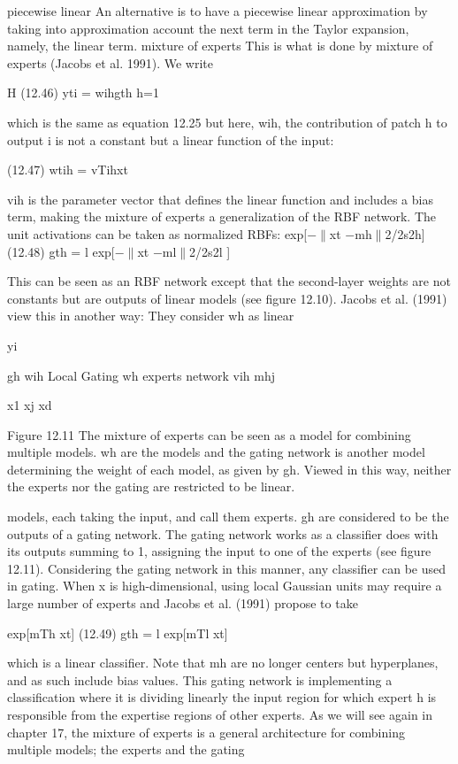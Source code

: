piecewise linear An alternative is to have a piecewise linear approximation by taking into approximation account the next term in the Taylor expansion, namely, the linear term. mixture of experts This is what is done by mixture of experts (Jacobs et al. 1991). We write

H (12.46) yti = wihgth h=1

which is the same as equation 12.25 but here, wih, the contribution of patch h to output i is not a constant but a linear function of the input:

(12.47) wtih = vTihxt

vih is the parameter vector that defines the linear function and includes a bias term, making the mixture of experts a generalization of the RBF network. The unit activations can be taken as normalized RBFs: exp[$-$$\parallel$xt $-$mh$\parallel$2/2s2h] (12.48) gth = l exp[$-$$\parallel$xt $-$ml$\parallel$2/2s2l ]

This can be seen as an RBF network except that the second-layer weights are not constants but are outputs of linear models (see figure 12.10). Jacobs et al. (1991) view this in another way: They consider wh as linear

yi

gh wih Local Gating wh experts network vih mhj

x1 xj xd

Figure 12.11 The mixture of experts can be seen as a model for combining multiple models. wh are the models and the gating network is another model determining the weight of each model, as given by gh. Viewed in this way, neither the experts nor the gating are restricted to be linear.

models, each taking the input, and call them experts. gh are considered to be the outputs of a gating network. The gating network works as a classifier does with its outputs summing to 1, assigning the input to one of the experts (see figure 12.11). Considering the gating network in this manner, any classifier can be used in gating. When x is high-dimensional, using local Gaussian units may require a large number of experts and Jacobs et al. (1991) propose to take

exp[mTh xt] (12.49) gth = l exp[mTl xt]

which is a linear classifier. Note that mh are no longer centers but hyperplanes, and as such include bias values. This gating network is implementing a classification where it is dividing linearly the input region for which expert h is responsible from the expertise regions of other experts. As we will see again in chapter 17, the mixture of experts is a general architecture for combining multiple models; the experts and the gating

